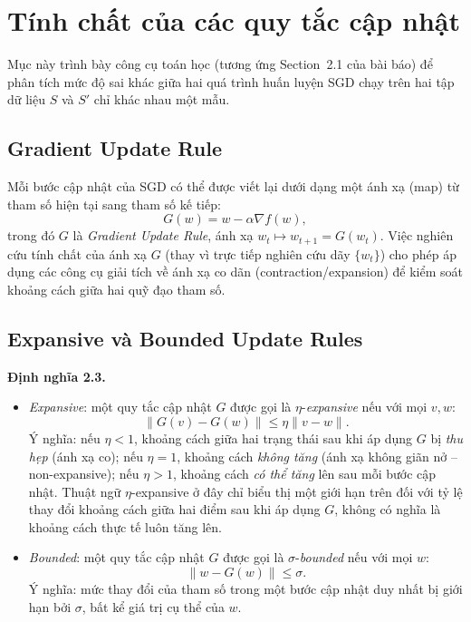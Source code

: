 \section{Tính chất của các quy tắc cập nhật}
\label{sec:quytaccapnhat}

Mục này trình bày công cụ toán học (tương ứng Section~2.1 của bài báo) để phân tích mức độ sai khác giữa hai quá trình huấn luyện SGD chạy trên hai tập dữ liệu $S$ và $S'$ chỉ khác nhau một mẫu.

\subsection{Gradient Update Rule}

Mỗi bước cập nhật của SGD có thể được viết lại dưới dạng một ánh xạ (map) từ tham số hiện tại sang tham số kế tiếp:
\[
G(w) = w - \alpha \nabla f(w),
\]
trong đó $G$ là \textit{Gradient Update Rule}, ánh xạ $w_t \mapsto w_{t+1} = G(w_t)$. Việc nghiên cứu tính chất của ánh xạ $G$ (thay vì trực tiếp nghiên cứu dãy $\{w_t\}$) cho phép áp dụng các công cụ giải tích về ánh xạ co dãn (contraction/expansion) để kiểm soát khoảng cách giữa hai quỹ đạo tham số.

\subsection{Expansive và Bounded Update Rules}

\textbf{Định nghĩa 2.3.}
\begin{itemize}
    \item \textit{Expansive}: một quy tắc cập nhật $G$ được gọi là $\eta$-\textit{expansive} nếu với mọi $v, w$:
    \[
    \|G(v) - G(w)\| \leq \eta \|v - w\|.
    \]
    Ý nghĩa: nếu $\eta < 1$, khoảng cách giữa hai trạng thái sau khi áp dụng $G$ bị \emph{thu hẹp} (ánh xạ co); nếu $\eta = 1$, khoảng cách \emph{không tăng} (ánh xạ không giãn nở -- non-expansive); nếu $\eta > 1$, khoảng cách \emph{có thể tăng} lên sau mỗi bước cập nhật. Thuật ngữ $\eta$-expansive ở đây chỉ biểu thị một giới hạn trên đối với tỷ lệ thay đổi khoảng cách giữa hai điểm sau khi áp dụng $G$, không có nghĩa là khoảng cách thực tế luôn tăng lên.
    \item \textit{Bounded}: một quy tắc cập nhật $G$ được gọi là $\sigma$-\textit{bounded} nếu với mọi $w$:
    \[
    \|w - G(w)\| \leq \sigma.
    \]
    Ý nghĩa: mức thay đổi của tham số trong một bước cập nhật duy nhất bị giới hạn bởi $\sigma$, bất kể giá trị cụ thể của $w$.
\end{itemize}

